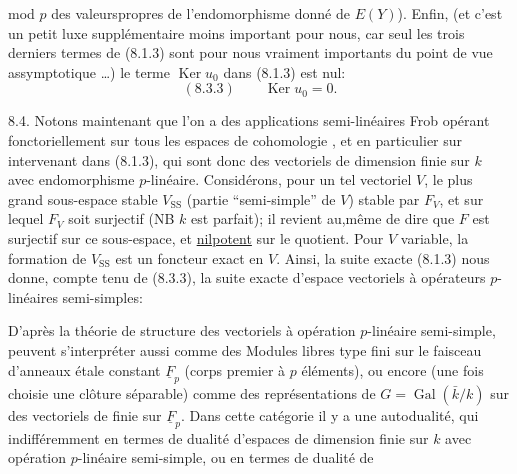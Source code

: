 
mod $p$ des valeurspropres de l'endomorphisme donné de $E(Y)$). Enfin, (et c'est un petit luxe supplémentaire moins important pour nous, car seul les trois derniers termes de (8.1.3) sont pour nous vraiment importants du point de vue assymptotique \ldots)  le  terme $\operatorname{Ker}u_0$ dans (8.1.3) est nul:
\[
(8.3.3)\qquad\operatorname{Ker}u_0=0.
\]

8.4. Notons maintenant que l'on a des applications semi-linéaires Frob opérant fonctoriellement sur tous les espaces de cohomologie , et en particulier sur  intervenant dans (8.1.3), qui sont donc des vectoriels de dimension finie sur $k$ avec endomorphisme $p$-linéaire. Considérons, pour un tel vectoriel $V$, le plus grand sous-espace  stable $V_{\mathrm{SS}}$ (partie ``semi-simple'' de $V$) stable par $F_V$, et sur lequel $F_V$ soit  surjectif (NB $k$ est parfait);  il revient au,même de dire que $F$ est surjectif sur ce sous-espace, et \uline{nilpotent} sur le quotient. Pour $V$ variable, la formation de $V_{\mathrm{SS}}$ est un foncteur exact en $V$. Ainsi, la suite exacte (8.1.3) nous donne, compte tenu de (8.3.3), la suite exacte d'espace vectoriels à opérateurs $p$-linéaires semi-simples:

 D'après la théorie de structure des vectoriels à opération $p$-linéaire semi-simple,  peuvent s'interpréter aussi comme des Modules libres  type fini sur le faisceau d'anneaux étale constant $\underline F_p$ (corps premier à $p$ éléments), ou encore  (une fois choisie une clôture séparable) comme des  représentations de $G=\operatorname{Gal}(\bar k/k)$ sur des vectoriels de  finie sur $\underline F_p$. Dans cette catégorie il y a une autodualité, qui  indifféremment en termes de dualité d'espaces de dimension finie sur $k$ avec opération $p$-linéaire semi-simple, ou en termes de dualité de

